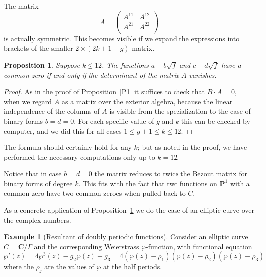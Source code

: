 \documentclass{jams-l}
\newtheorem{proposition}[theorem]{Proposition}
\theoremstyle{definition}
\newtheorem{example}[theorem]{Example}
\theoremstyle{remark}
\newcommand{\CC}{{\mathbf C}}
\newcommand{\PP}{{\mathbf P}}
\begin{document}
The matrix 
\[
A=\begin{pmatrix}A^{11} & A^{12} \\ A^{21} & A^{22} \\ \end{pmatrix}
\]
 is actually symmetric. This becomes visible if we expand the
expressions into brackets of the smaller $2\times (2k+1-g)$ matrix.

\begin{proposition}\label{hyperelliptic bezout}
Suppose $k \le 12$. The functions $a+b\sqrt f$ and $c+d\sqrt f$ have a common zero
if and only if the determinant of the matrix
$A$ vanishes.
\end{proposition}

\begin{proof} As in the proof of Proposition~\ref{P1} it suffices to check that
$B\cdot A = 0$, when we regard $A$ as a matrix over the exterior algebra,
because the linear independence of the columns of $A$ is visible from
the specialization to the case of binary forms  $b=d=0$.
For
each specific value of $g$ and $k$ this can be checked by computer,
and we did this for all cases $1\le g+1 \le k \le 12$. 
\end{proof}

The formula should certainly hold for any $k$; but as noted in the 
proof, we have performed the necessary computations only up to $k=12$.

Notice that in case $b=d=0$ the matrix reduces to twice the 
Bezout matrix 
for binary forms of degree $k$. This fits with the fact that 
two functions on $\PP^1$ with a common zero have two common 
zeroes when  pulled back to $C$. 

As a concrete application of Proposition~\ref{hyperelliptic bezout} we do
the case of an elliptic curve over the complex numbers. 

\begin{example}[Resultant of doubly periodic functions]
\label{resultant of doubly periodic functions}
Consider an elliptic curve $C=\CC/\Gamma$ and the corresponding
Weierstrass $\wp$-function, with functional equation
\[
\wp'(z)= 4\wp^3(z)-g_2\wp(z)-g_3=4(\wp(z)-\rho_1)(\wp(z)-\rho_2)(\wp(z)-\rho_3)
\]
where the ${\rho_j}$ are the values of $\wp$ at the half periods.
\end{example}
\end{document}
